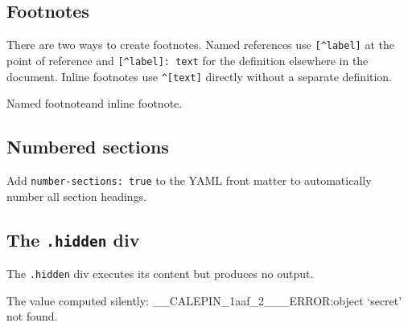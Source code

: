 \documentclass[11pt]{article}
\begin{document}
\subsection*{Footnotes}
\label{footnotes}

There are two ways to create footnotes. Named references use \texttt{{[}\^{}label{]}} at the point of reference and \texttt{{[}\^{}label{]}: text} for the definition elsewhere in the document. Inline footnotes use \texttt{\^{}{[}text{]}} directly without a separate definition.

Named footnote\footnotemark[2] and inline footnote\footnotemark[3].

\subsection*{Numbered sections}
\label{numbered-sections}

Add \texttt{number-sections: true} to the YAML front matter to automatically number all section headings.

\subsection*{The \texttt{.hidden} div}
\label{the-div}

The \texttt{.hidden} div executes its content but produces no output.


The value computed silently: \_\_CALEPIN\_1aaf\_2\_\_\_ERROR:object `secret' not found.
\end{document}

